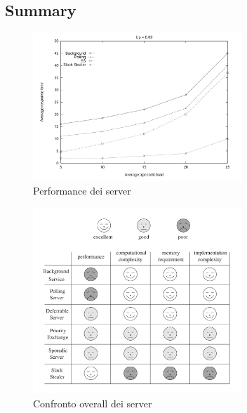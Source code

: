 \documentclass[12pt]{article}
\begin{document}
\subsection{Summary}
\begin{figure}[H]
    \centering
    \includegraphics[width=0.7\textwidth]{pictures/performanceComparison.png}
    \caption{Performance dei server}
    \label{fig:performanceComparison}
\end{figure}
\begin{figure}[H]
    \centering
    \includegraphics[width=0.7\textwidth]{pictures/comparisonServer.png}
    \caption{Confronto overall dei server}
    \label{fig:comparisonServer}
\end{figure}
\end{document}
